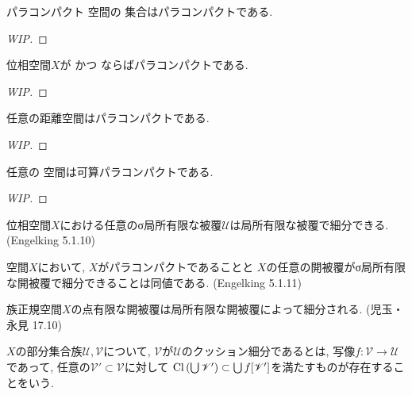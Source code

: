 \documentclass[uplatex, dvipdfmx, a4paper, 12pt, class=jsbook, crop=false]{standalone}
\begin{document}
\begin{proposition}
	パラコンパクト \Hausdorff 空間の \Fsigma 集合はパラコンパクトである.
\end{proposition}
\begin{proof}
	[WIP]
\end{proof}

\begin{theorem}
	位相空間$ X $が  かつ \Lindelof ならばパラコンパクトである.
\end{theorem}
\begin{proof}
	[WIP]
\end{proof}

\begin{theorem}[A. H. Stone]
	任意の距離空間はパラコンパクトである.
\end{theorem}
\begin{proof}
	[WIP]
\end{proof}

\begin{proposition}
	任意の  空間は可算パラコンパクトである.
\end{proposition}
\begin{proof}
	[WIP]
\end{proof}

\begin{proposition}
	位相空間$ X $における任意のσ局所有限な被覆$ \mathscr{U} $は局所有限な被覆で細分できる.
	(Engelking 5.1.10)
\end{proposition}

\begin{proposition}
	 空間$ X $において, $ X $がパラコンパクトであることと
	$ X $の任意の開被覆がσ局所有限な開被覆で細分できることは同値である.
	(Engelking 5.1.11)
\end{proposition}

\begin{proposition}
	族正規空間$ X $の点有限な開被覆は局所有限な開被覆によって細分される.
	(児玉・永見 17.10)
\end{proposition}

\begin{definition}
	$ X $の部分集合族$ \mathscr{U}, \mathscr{V} $について, $ \mathscr{V} $が$ \mathscr{U} $のクッション細分であるとは,
	写像$ f \colon \mathscr{V} \to \mathscr{U} $であって, 任意の$ \mathscr{V}' \subset \mathscr{V} $に対して
	$ \mathop{\mathrm{Cl}}\nolimits \left(\bigcup \mathscr{V}' \right) \subset \bigcup f[\mathscr{V}'] $を満たすものが存在することをいう.
\end{definition}
\end{document}
